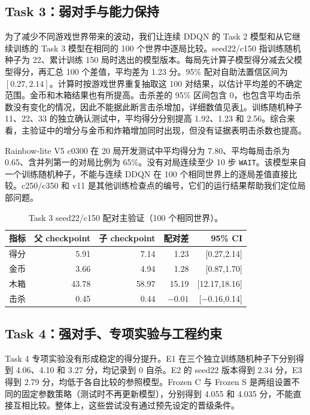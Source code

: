 \documentclass[UTF8,11pt,a4paper,fontset=none]{ctexart}
\begin{document}
\subsection{Task 3：弱对手与能力保持}
为了减少不同游戏世界带来的波动，我们让连续 DDQN 的 Task 2 模型和从它继续训练的 Task 3 模型在相同的 100 个世界中逐局比较。seed22/c150 指训练随机种子为 22、累计训练 150 局时选出的模型版本。每局先计算子模型得分减去父模型得分，再汇总 100 个差值，平均差为 1.23 分。95\% 配对自助法置信区间为 $[0.27,2.14]$。计算时按游戏世界重复抽取这 100 对结果，以估计平均差的不确定范围。金币和木箱结果也有所提高。击杀差的 95\% 区间包含 0，也包含平均击杀数没有变化的情况，因此不能据此断言击杀增加，详细数值见表\ref{tab:task3}。训练随机种子 11、22、33 的独立确认测试中，平均得分分别提高 1.92、1.23 和 2.56。综合来看，主验证中的增分与金币和炸箱增加同时出现，但没有证据表明击杀数也提高。

Rainbow-lite V5 c0300 在 20 局开发测试中平均得分为 7.80、平均每局击杀为 0.65、含并列第一的对局比例为 65\%。没有对局连续至少 10 步 \texttt{WAIT}。该模型来自一个训练随机种子，不能与连续 DDQN 在 100 个相同世界上的逐局差值直接比较。c250/c350 和 v11 是其他训练检查点的编号，它们的运行结果帮助我们定位局部问题。

\begin{table}[H]\centering\small
\caption{Task 3 seed22/c150 配对主验证（100 个相同世界）。}\label{tab:task3}
\begin{tabular}{lrrrr}\toprule
指标 & 父 checkpoint & 子 checkpoint & 配对差 & 95\% CI\\\midrule
得分 &5.91&7.14&1.23&[0.27,2.14]\\
金币 &3.66&4.94&1.28&[0.87,1.70]\\
木箱 &43.78&58.97&15.19&[12.17,18.16]\\
击杀 &0.45&0.44&$-0.01$&[$-0.16$,0.14]\\\bottomrule
\end{tabular}
\end{table}

\subsection{Task 4：强对手、专项实验与工程约束}
Task 4 专项实验没有形成稳定的得分提升。E1 在三个独立训练随机种子下分别得到 4.06、4.10 和 3.27 分，均记录到 0 自杀。E2 的 seed22 版本得到 2.34 分，E3 得到 2.79 分，均低于各自比较的参照模型。Frozen C 与 Frozen S 是两组设置不同的固定参数策略（测试时不再更新模型），分别得到 4.055 和 4.035 分，不能直接互相比较。整体上，这些尝试没有通过预先设定的晋级条件。
\end{document}

